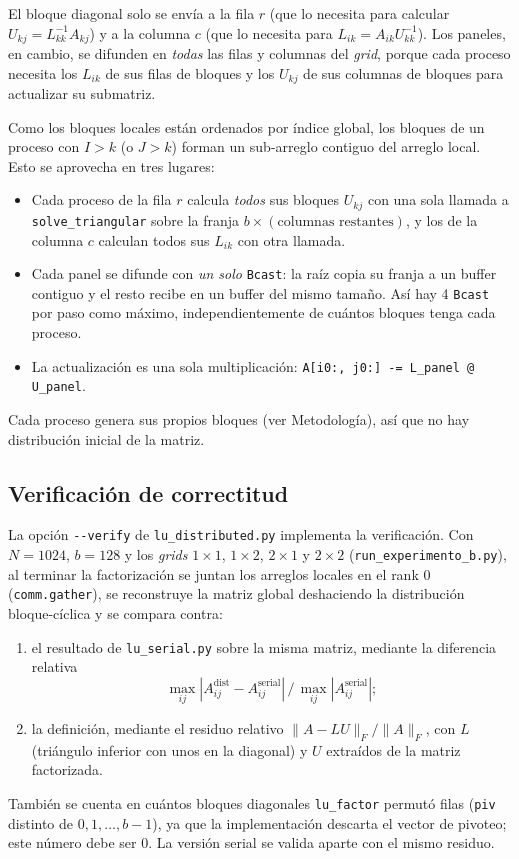 \documentclass[11pt,a4paper]{article}
\begin{document}
El bloque diagonal solo se envía a la fila $r$ (que lo necesita para calcular $U_{kj}=L_{kk}^{-1}A_{kj}$) y a la columna $c$ (que lo necesita para $L_{ik}=A_{ik}U_{kk}^{-1}$). Los paneles, en cambio, se difunden en \emph{todas} las filas y columnas del \emph{grid}, porque cada proceso necesita los $L_{ik}$ de sus filas de bloques y los $U_{kj}$ de sus columnas de bloques para actualizar su submatriz.

Como los bloques locales están ordenados por índice global, los bloques de un proceso con $I>k$ (o $J>k$) forman un sub-arreglo contiguo del arreglo local. Esto se aprovecha en tres lugares:
\begin{itemize}
  \item Cada proceso de la fila $r$ calcula \emph{todos} sus bloques $U_{kj}$ con una sola llamada a \texttt{solve\_triangular} sobre la franja $b\times(\text{columnas restantes})$, y los de la columna $c$ calculan todos sus $L_{ik}$ con otra llamada.
  \item Cada panel se difunde con \emph{un solo} \texttt{Bcast}: la raíz copia su franja a un buffer contiguo y el resto recibe en un buffer del mismo tamaño. Así hay 4 \texttt{Bcast} por paso como máximo, independientemente de cuántos bloques tenga cada proceso.
  \item La actualización es una sola multiplicación: \texttt{A[i0:, j0:] -= L\_panel @ U\_panel}.
\end{itemize}
Cada proceso genera sus propios bloques (ver Metodología), así que no hay distribución inicial de la matriz.

\subsection{Verificación de correctitud}
La opción \texttt{-{}-verify} de \texttt{lu\_distributed.py} implementa la verificación. Con $N=1024$, $b=128$ y los \emph{grids} $1\times1$, $1\times2$, $2\times1$ y $2\times2$ (\texttt{run\_experimento\_b.py}), al terminar la factorización se juntan los arreglos locales en el rank 0 (\texttt{comm.gather}), se reconstruye la matriz global deshaciendo la distribución bloque-cíclica y se compara contra:
\begin{enumerate}
  \item el resultado de \texttt{lu\_serial.py} sobre la misma matriz, mediante la diferencia relativa \[\max_{ij}|A^{\text{dist}}_{ij}-A^{\text{serial}}_{ij}|\,/\,\max_{ij}|A^{\text{serial}}_{ij}|;\]
  \item la definición, mediante el residuo relativo $\|A-LU\|_F/\|A\|_F$, con $L$ (triángulo inferior con unos en la diagonal) y $U$ extraídos de la matriz factorizada.
\end{enumerate}
También se cuenta en cuántos bloques diagonales \texttt{lu\_factor} permutó filas (\texttt{piv} distinto de $0,1,\dots,b-1$), ya que la implementación descarta el vector de pivoteo; este número debe ser 0. La versión serial se valida aparte con el mismo residuo.
\end{document}
